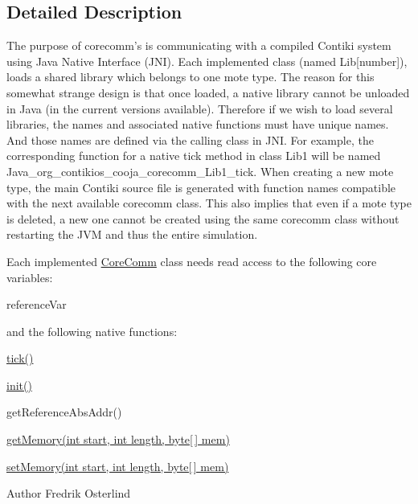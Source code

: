 \subsection{Detailed Description}
The purpose of corecomm's is communicating with a compiled Contiki system using Java Native Interface (J\-N\-I). Each implemented class (named Lib\mbox{[}number\mbox{]}), loads a shared library which belongs to one mote type. The reason for this somewhat strange design is that once loaded, a native library cannot be unloaded in Java (in the current versions available). Therefore if we wish to load several libraries, the names and associated native functions must have unique names. And those names are defined via the calling class in J\-N\-I. For example, the corresponding function for a native tick method in class Lib1 will be named Java\-\_\-org\-\_\-contikios\-\_\-cooja\-\_\-corecomm\-\_\-\-Lib1\-\_\-tick. When creating a new mote type, the main Contiki source file is generated with function names compatible with the next available corecomm class. This also implies that even if a mote type is deleted, a new one cannot be created using the same corecomm class without restarting the J\-V\-M and thus the entire simulation.

Each implemented \hyperlink{classorg_1_1contikios_1_1cooja_1_1CoreComm}{Core\-Comm} class needs read access to the following core variables\-: 
\begin{DoxyItemize}
\item reference\-Var 
\end{DoxyItemize}and the following native functions\-: 
\begin{DoxyItemize}
\item \hyperlink{classorg_1_1contikios_1_1cooja_1_1CoreComm_a6e6496eaaca78e77d975cfb08ebdf27f}{tick()} 
\item \hyperlink{classorg_1_1contikios_1_1cooja_1_1CoreComm_a50bd0205ea051af5404a2ffd44155899}{init()} 
\item get\-Reference\-Abs\-Addr() 
\item \hyperlink{classorg_1_1contikios_1_1cooja_1_1CoreComm_ace5ee251afbf614f27a7abe3da248d05}{get\-Memory(int start, int length, byte\mbox{[}$\,$\mbox{]} mem)} 
\item \hyperlink{classorg_1_1contikios_1_1cooja_1_1CoreComm_a81682a84197a91fe8b54fe80ded9c322}{set\-Memory(int start, int length, byte\mbox{[}$\,$\mbox{]} mem)}

\begin{DoxyAuthor}{Author}
Fredrik Osterlind 
\end{DoxyAuthor}

\end{DoxyItemize}

